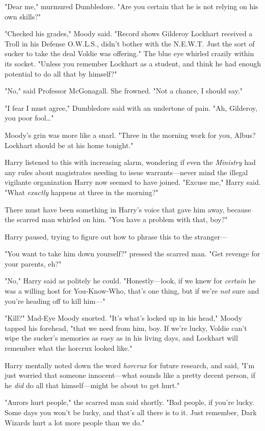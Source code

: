 "Dear me," murmured Dumbledore. "Are you certain that he is not relying on his own skills?"

"Checked his grades," Moody said. "Record shows Gilderoy Lockhart received a Troll in his Defense O.W.L.S., didn't bother with the N.E.W.T. Just the sort of sucker to take the deal Voldie was offering." The blue eye whirled crazily within its socket. "Unless you remember Lockhart as a student, and think he had enough potential to do all that by himself?"

"No," said Professor McGonagall. She frowned. "Not a chance, I should say."

"I fear I must agree," Dumbledore said with an undertone of pain. "Ah, Gilderoy, you poor fool{\ldots}"

Moody's grin was more like a snarl. "Three in the morning work for you, Albus? Lockhart should be at his home tonight."

Harry listened to this with increasing alarm, wondering if even the \emph{Ministry} had any rules about magistrates needing to issue warrants---never mind the illegal vigilante organization Harry now seemed to have joined. "Excuse me," Harry said. "What \emph{exactly} happens at three in the morning?"

There must have been something in Harry's voice that gave him away, because the scarred man whirled on him. "You have a problem with that, boy?"

Harry paused, trying to figure out how to phrase this to the stranger---

"You want to take him down yourself?" pressed the scarred man. "Get revenge for your parents, eh?"

"No," Harry said as politely he could. "Honestly---look, if we knew for \emph{certain} he was a willing host for You-Know-Who, that's one thing, but if we're \emph{not} sure and you're heading off to kill him---"

"Kill?" Mad-Eye Moody snorted. "It's what's locked up in his head," Moody tapped his forehead, "that we need from him, boy. If we're lucky, Voldie can't wipe the sucker's memories as easy as in his living days, and Lockhart will remember what the horcrux looked like."

Harry mentally noted down the word \emph{horcrux} for future research, and said, "I'm just worried that someone innocent---what sounds like a pretty decent person, if he \emph{did} do all that himself---might be about to get hurt."

"Aurors hurt people," the scarred man said shortly. "Bad people, if you're lucky. Some days you won't be lucky, and that's all there is to it. Just remember, Dark Wizards hurt a lot more people than we do."

